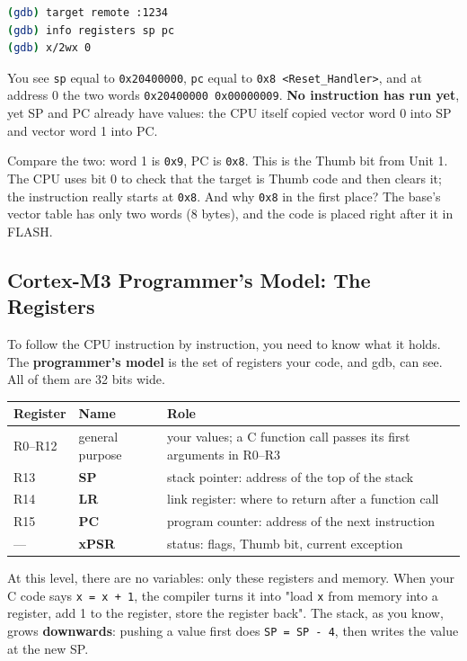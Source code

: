 \begin{lstlisting}[language=bash]
(gdb) target remote :1234
(gdb) info registers sp pc
(gdb) x/2wx 0
\end{lstlisting}

You see \texttt{sp} equal to \texttt{0x20400000}, \texttt{pc} equal to \texttt{0x8 <Reset\_Handler>}, and at address 0 the two words \texttt{0x20400000 0x00000009}. \textbf{No instruction has run yet}, yet SP and PC already have values: the CPU itself copied vector word 0 into SP and vector word 1 into PC. 

Compare the two: word 1 is \texttt{0x9}, PC is \texttt{0x8}. This is the Thumb bit from Unit 1. The CPU uses bit 0 to check that the target is Thumb code and then clears it; the instruction really starts at \texttt{0x8}. And why \texttt{0x8} in the first place? The base's vector table has only two words (8 bytes), and the code is placed right after it in FLASH.

\subsection{Cortex-M3 Programmer's Model: The Registers}
To follow the CPU instruction by instruction, you need to know what it holds. The \textbf{programmer's model} is the set of registers your code, and gdb, can see. All of them are 32 bits wide.

\begin{table}[h!]
    \centering
    \begin{tabular}{|l|l|l|}
        \hline
        \textbf{Register} & \textbf{Name} & \textbf{Role} \\ \hline
        R0--R12 & general purpose & your values; a C function call passes its first arguments in R0--R3 \\ \hline
        R13 & \textbf{SP} & stack pointer: address of the top of the stack \\ \hline
        R14 & \textbf{LR} & link register: where to return after a function call \\ \hline
        R15 & \textbf{PC} & program counter: address of the next instruction \\ \hline
        --- & \textbf{xPSR} & status: flags, Thumb bit, current exception \\ \hline
    \end{tabular}
\end{table}

At this level, there are no variables: only these registers and memory. When your C code says \texttt{x = x + 1}, the compiler turns it into "load \texttt{x} from memory into a register, add 1 to the register, store the register back". The stack, as you know, grows \textbf{downwards}: pushing a value first does \texttt{SP = SP - 4}, then writes the value at the new SP.

